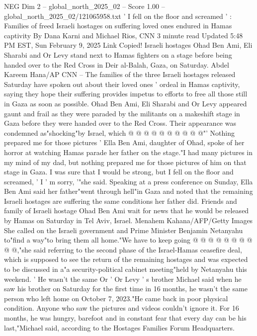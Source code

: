 \begin{textsample}{NEG Dim 2 – global\_north\_2025\_02 – Score 1.00 – global\_north\_2025\_02/121065958.txt}  \label{ex:f2_neg_015}
' I fell on the floor and screamed ' : Families of freed Israeli hostages on suffering loved ones endured in Hamas captivity By Dana Karni and Michael Rios, CNN 3 minute read Updated 5:48 PM EST, Sun February 9, 2025 Link Copied!
Israeli hostages Ohad Ben Ami, Eli Sharabi and Or Levy stand next to Hamas fighters on a stage before being handed over to the Red Cross in Deir al-Balah, Gaza, on Saturday.
Abdel Kareem Hana/AP CNN -- The families of the three Israeli hostages released Saturday have spoken out about their loved ones ' ordeal in Hamas captivity, saying they hope their suffering provides impetus to efforts to free all those still in Gaza as soon as possible.
Ohad Ben Ami, Eli Sharabi and Or Levy appeared gaunt and frail as they were paraded by the militants on a makeshift stage in Gaza before they were handed over to the Red Cross.
Their appearance was condemned as"shocking"by Israel, which @ @ @ @ @ @ @ @ @ @"' Nothing prepared me for those pictures ' Ella Ben Ami, daughter of Ohad, spoke of her horror at watching Hamas parade her father on the stage."I had many pictures in my mind of my dad, but nothing prepared me for those pictures of him on that stage in Gaza.
I was sure that I would be strong, but I fell on the floor and screamed, ' I ' m sorry, '"she said.
Speaking at a press conference on Sunday, Ella Ben Ami said her father"went through hell"in Gaza and noted that the remaining Israeli hostages are suffering the same conditions her father did.
Friends and family of Israeli hostage Ohad Ben Ami wait for news that he would be released by Hamas on Saturday in Tel Aviv, Israel.
Menahem Kahana/AFP/Getty Images She called on the Israeli government and Prime Minister Benjamin Netanyahu to"find a way"to bring them all home."We have to keep going @ @ @ @ @ @ @ @ @ @,"she said referring to the second phase of the Israel-Hamas ceasefire deal, which is supposed to see the return of the remaining hostages and was expected to be discussed in a"a security-political cabinet meeting"held by Netanyahu this weekend. ' He wasn't the same Or ' Or Levy ' s brother Michael said when he saw his brother on Saturday for the first time in 16 months, he wasn't the same person who left home on October 7, 2023."He came back in poor physical condition.
Anyone who saw the pictures and videos couldn't ignore it.
For 16 months, he was hungry, barefoot and in constant fear that every day can be his last,"Michael said, according to the Hostages Families Forum Headquarters.

\end{textsample}
